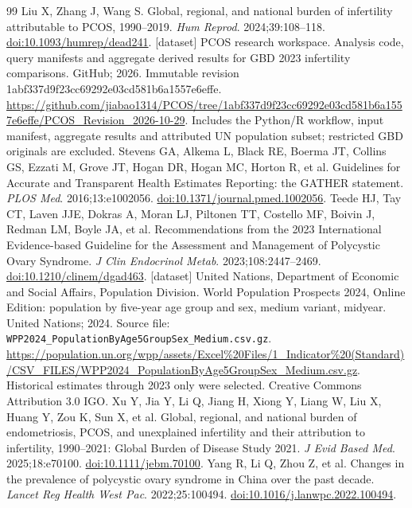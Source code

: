 \documentclass[11pt,a4paper]{article}
\begin{document}
{\begin{thebibliography}{99}
Liu X, Zhang J, Wang S. Global, regional, and national burden of infertility attributable to PCOS, 1990--2019. \emph{Hum Reprod}. 2024;39:108--118. \href{https://doi.org/10.1093/humrep/dead241}{doi:10.1093/humrep/dead241}.
[dataset] PCOS research workspace. Analysis code, query manifests and aggregate derived results for GBD 2023 infertility comparisons. GitHub; 2026. Immutable revision 1abf337d9f23cc69292e03cd581b6a1557e6effe. \url{https://github.com/jiabao1314/PCOS/tree/1abf337d9f23cc69292e03cd581b6a1557e6effe/PCOS_Revision_2026-10-29}. Includes the Python/R workflow, input manifest, aggregate results and attributed UN population subset; restricted GBD originals are excluded.
Stevens GA, Alkema L, Black RE, Boerma JT, Collins GS, Ezzati M, Grove JT, Hogan DR, Hogan MC, Horton R, et al. Guidelines for Accurate and Transparent Health Estimates Reporting: the GATHER statement. \emph{PLOS Med}. 2016;13:e1002056. \href{https://doi.org/10.1371/journal.pmed.1002056}{doi:10.1371/journal.pmed.1002056}.
Teede HJ, Tay CT, Laven JJE, Dokras A, Moran LJ, Piltonen TT, Costello MF, Boivin J, Redman LM, Boyle JA, et al. Recommendations from the 2023 International Evidence-based Guideline for the Assessment and Management of Polycystic Ovary Syndrome. \emph{J Clin Endocrinol Metab}. 2023;108:2447--2469. \href{https://doi.org/10.1210/clinem/dgad463}{doi:10.1210/clinem/dgad463}.
[dataset] United Nations, Department of Economic and Social Affairs, Population Division. World Population Prospects 2024, Online Edition: population by five-year age group and sex, medium variant, midyear. United Nations; 2024. Source file: \texttt{WPP2024\_PopulationByAge5GroupSex\_Medium.csv.gz}. \url{https://population.un.org/wpp/assets/Excel%20Files/1_Indicator%20(Standard)/CSV_FILES/WPP2024_PopulationByAge5GroupSex_Medium.csv.gz}. Historical estimates through 2023 only were selected. Creative Commons Attribution 3.0 IGO.
Xu Y, Jia Y, Li Q, Jiang H, Xiong Y, Liang W, Liu X, Huang Y, Zou K, Sun X, et al. Global, regional, and national burden of endometriosis, PCOS, and unexplained infertility and their attribution to infertility, 1990--2021: Global Burden of Disease Study 2021. \emph{J Evid Based Med}. 2025;18:e70100. \href{https://doi.org/10.1111/jebm.70100}{doi:10.1111/jebm.70100}.
Yang R, Li Q, Zhou Z, et al. Changes in the prevalence of polycystic ovary syndrome in China over the past decade. \emph{Lancet Reg Health West Pac}. 2022;25:100494. \href{https://doi.org/10.1016/j.lanwpc.2022.100494}{doi:10.1016/j.lanwpc.2022.100494}.
\end{thebibliography}
}
\clearpage
\end{document}
